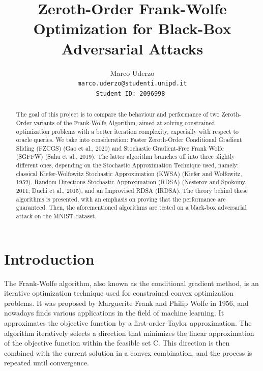 \documentclass[10pt,twocolumn,letterpaper]{article}
\begin{document}
\title{Zeroth-Order Frank-Wolfe Optimization for Black-Box Adversarial Attacks}

\author{Marco Uderzo  \\
{\tt\small marco.uderzo@studenti.unipd.it}\\ 
\tt \small Student ID: 2096998
}

\maketitle

\begin{abstract}
   The goal of this project is to compare the behaviour and performance
   of two Zeroth-Order variants of the Frank-Wolfe Algorithm, aimed at 
   solving constrained optimization problems with a better iteration complexity,
   expecially with respect to oracle queries.
   We take into consideration: Faster Zeroth-Order Conditional Gradient Sliding (FZCGS)
   (Gao et al., 2020)\cite{Gao} and Stochastic Gradient-Free Frank Wolfe 
   (SGFFW) (Sahu et al., 2019)\cite{Sahu}. The latter algorithm branches off into three slightly different ones,
   depending on the Stochastic Approximation Technique used, namely: classical Kiefer-Wolfowitz
   Stochastic Approximation (KWSA) (Kiefer and Wolfowitz, 1952), Random Directions Stochastic Approximation
   (RDSA) (Nesterov and Spokoiny, 2011; Duchi et al., 2015), and an Improvised RDSA (IRDSA). 
   The theory behind these algorithms is presented, with an emphasis on proving that the performance are guaranteed. 
   Then, the aforementioned algorithms are tested on a black-box adversarial attack on the MNIST dataset. 

\end{abstract}

\section{Introduction}

The Frank-Wolfe algorithm, also known as the conditional gradient method, 
is an iterative optimization technique used for constrained convex optimization problems. 
It was proposed by Marguerite Frank and Philip Wolfe in 1956, and nowadays finds various applications
in the field of machine learning. It approximates the objective function by a first-order Taylor approximation.
The algorithm iteratively selects a direction that minimizes the linear approximation of the objective function
within the feasible set C. This direction is then combined with the current solution in a convex combination, and the
process is repeated until convergence.
\end{document}
